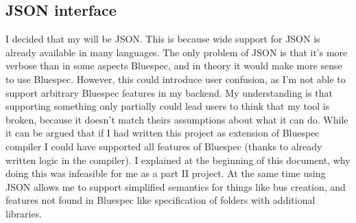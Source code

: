 \documentclass[12pt]{report}
\begin{document}
\subsection{JSON interface}
I decided that my  will be JSON. This is because wide support for JSON is already available in many languages. 
The only problem of JSON is that it's more verbose than in some aspects Bluespec, and in theory it would make more sense to use Bluespec. 
However, this could introduce user confusion, as I'm not able to support arbitrary Bluespec features in my backend.
My understanding is that supporting something only partially could lead users to think that my tool is broken, because it doesn't match theirs assumptions about what it can do. 
While it can be argued that if I had written this project as extension of Bluespec compiler I could have supported all features of Bluespec (thanks to already written logic in the compiler). 
I explained at the beginning of this document, why doing this was infeasible for me as a part II project. 
At the same time using JSON allows me to support simplified semantics for things like bus creation, and features not found in Bluespec like specification of folders with additional libraries.
\newpage
\end{document}
